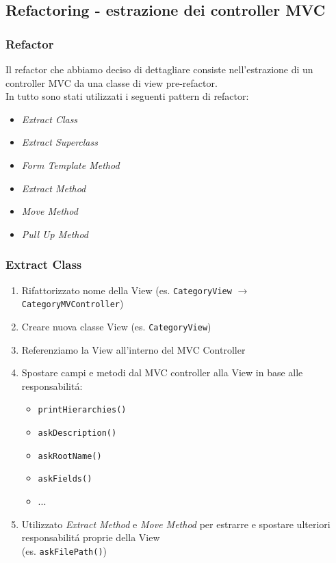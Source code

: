 \subsection{Refactoring - estrazione dei controller MVC}
\beamertitle

\begin{frame}
    \frametitle{Refactor}
    Il refactor che abbiamo deciso di dettagliare consiste nell'estrazione di
    un controller MVC da una classe di view pre-refactor.
    \\
    \medskip
    In tutto sono stati utilizzati i seguenti pattern di refactor:
    \begin{itemize}
        \item \emph{Extract Class}
        \item \emph{Extract Superclass}
        \item \emph{Form Template Method}
        \item \emph{Extract Method}
        \item \emph{Move Method}
        \item \emph{Pull Up Method}
    \end{itemize}
\end{frame}

\begin{frame}
    \frametitle{Extract Class}
    \begin{enumerate}
        \item Rifattorizzato nome della View (es. \texttt{CategoryView} $\to$ \texttt{CategoryMVController})
        \item Creare nuova classe View (es. \texttt{CategoryView})
        \item Referenziamo la View all'interno del MVC Controller
        \item Spostare campi e metodi dal MVC controller alla View in base alle responsabilitá:
          \begin{itemize}
              \item \texttt{printHierarchies()}
              \item \texttt{askDescription()}
              \item \texttt{askRootName()}
              \item \texttt{askFields()}
              \item ...
          \end{itemize}
        \item Utilizzato \emph{Extract Method} e \emph{Move Method} per estrarre e spostare ulteriori responsabilitá proprie della View
              \\(es. \texttt{askFilePath()})
    \end{enumerate}
\end{frame}


